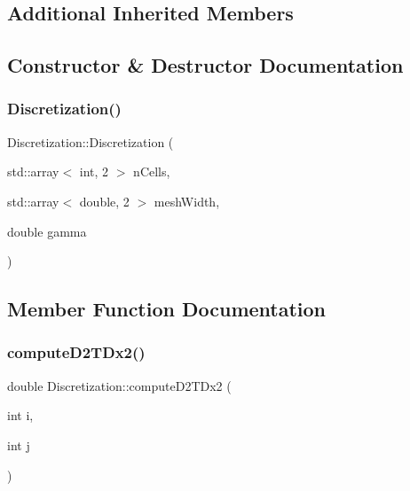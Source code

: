 \subsection*{Additional Inherited Members}


\subsection{Constructor \& Destructor Documentation}
\mbox{\label{classDiscretization_aec862c98dd3f9a3f15a487b7359d7669}} 
\subsubsection{\texorpdfstring{Discretization()}{Discretization()}}
{\footnotesize\ttfamily Discretization\+::\+Discretization (\begin{DoxyParamCaption}\item[{std\+::array$<$ int, 2 $>$}]{n\+Cells,  }\item[{std\+::array$<$ double, 2 $>$}]{mesh\+Width,  }\item[{double}]{gamma }\end{DoxyParamCaption})}



\subsection{Member Function Documentation}
\mbox{\label{classDiscretization_a6d7f1363e1c53d19bc98785f6366b166}} 
\subsubsection{\texorpdfstring{computeD2TDx2()}{computeD2TDx2()}}
{\footnotesize\ttfamily double Discretization\+::compute\+D2\+T\+Dx2 (\begin{DoxyParamCaption}\item[{int}]{i,  }\item[{int}]{j }\end{DoxyParamCaption})}

\mbox{\label{classDiscretization_ae2f9a1e4aedee8838ec4061dad81f3d3}} 
